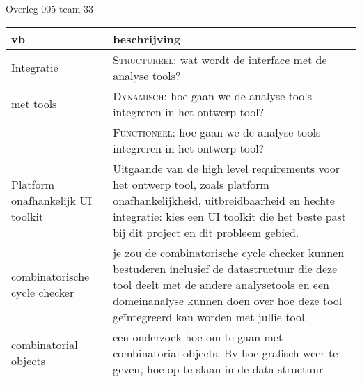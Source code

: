 \documentclass{article}
\begin{document}
\begin{Minutes}{Overleg 005 team 33}
\begin{center}
    \begin{tabular}{|p{2.5cm}|p{10cm}|}
    \hline
        {\bf vb}		& {\bf beschrijving} \\\hline
        Integratie		& \textsc{Structureel}: wat wordt de interface met de analyse tools? \\
	met tools 		& \textsc{Dynamisch}: hoe gaan we de analyse tools integreren in het ontwerp tool?\\
				& \textsc{Functioneel}: hoe gaan we de analyse tools integreren in het ontwerp tool?\\\hline
        Platform onafhankelijk UI toolkit & Uitgaande van de high level requirements voor het ontwerp
					    tool, zoals platform onafhankelijkheid, uitbreidbaarheid
					    en hechte integratie: kies een UI toolkit die het
					    beste past bij dit project en dit probleem gebied.\\\hline
        combinatorische cycle checker & je zou de combinatorische cycle checker kunnen bestuderen inclusief de datastructuur die
					deze tool deelt met de andere analysetools en een domeinanalyse kunnen doen
					over hoe deze tool ge\"{i}ntegreerd kan worden met jullie tool.\\\hline
         combinatorial objects &  een onderzoek hoe om te gaan met combinatorial objects.
				    Bv hoe grafisch weer te geven, hoe op te slaan in de data structuur\\\hline
    \end{tabular}

\end{center}

\end{Minutes}
\end{document}
